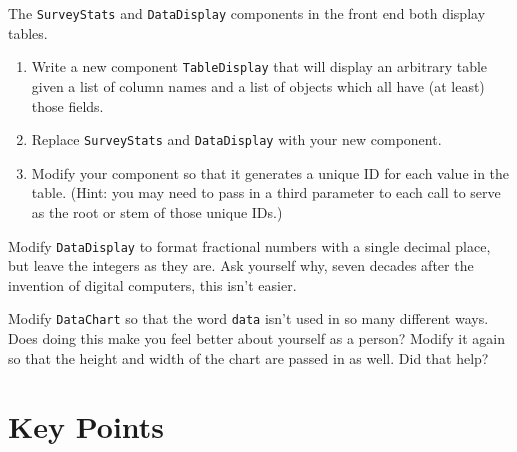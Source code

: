 
The \texttt{SurveyStats} and \texttt{DataDisplay} components in the front end both display tables.

\begin{enumerate}
\item
  Write a new component \texttt{TableDisplay} that will display an arbitrary table
  given a list of column names
  and a list of objects which all have (at least) those fields.
\item
  Replace \texttt{SurveyStats} and \texttt{DataDisplay} with your new component.
\item
  Modify your component so that it generates a unique ID for each value in the table.
  (Hint: you may need to pass in a third parameter to each call
  to serve as the root or stem of those unique IDs.)
\end{enumerate}


Modify \texttt{DataDisplay} to format fractional numbers with a single decimal place,
but leave the integers as they are.
Ask yourself why,
seven decades after the invention of digital computers,
this isn't easier.


Modify \texttt{DataChart} so that the word \texttt{data} isn't used in so many different ways.
Does doing this make you feel better about yourself as a person?
Modify it again so that the height and width of the chart are passed in as well.
Did that help?

\section*{Key Points}


